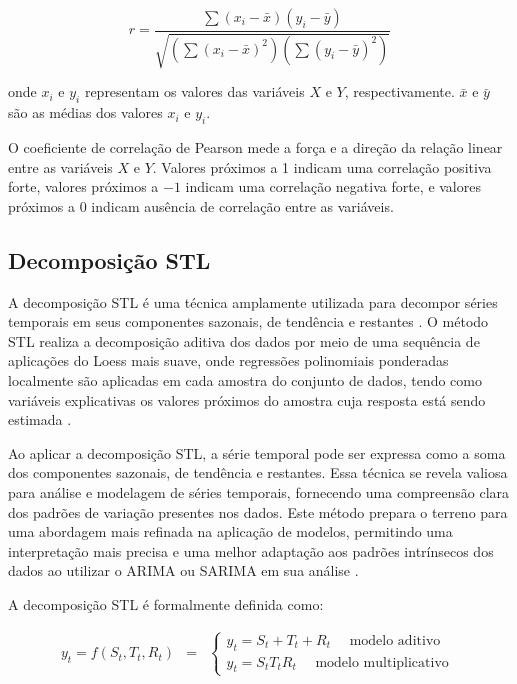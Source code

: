  \begin{equation}
 	r=\frac{\sum\left(x_i-\bar{x}\right)\left(y_i-\bar{y}\right)}{\sqrt{\left(\sum\left(x_i-\bar{x}\right)^2\right)\left(\sum\left(y_i-\bar{y}\right)^2\right)}}
 \end{equation}
 
 \noindent onde $x_i$ e $y_i$ representam os valores das variáveis $X$ e $Y$, respectivamente. $\bar{x}$ e $\bar{y}$ são as médias dos valores $x_i$ e $y_i$. 
 
O coeficiente de correlação de Pearson mede a força e a direção da relação linear entre as variáveis $X$ e $Y$. Valores próximos a 1 indicam uma correlação positiva forte, valores próximos a $-1$ indicam uma correlação negativa forte, e valores próximos a $0$ indicam  ausência de correlação entre as variáveis.
 
\subsection{Decomposi\c c\~ao STL}
 
A decomposição STL é uma técnica amplamente utilizada para decompor séries temporais em seus componentes sazonais, de tendência e restantes \cite{RIBEIRO2023112982}. O método STL realiza a decomposição aditiva dos dados por meio de uma sequência de aplicações do Loess mais suave, onde regressões polinomiais ponderadas localmente são aplicadas em cada amostra do conjunto de dados, tendo como variáveis explicativas os valores próximos do amostra cuja resposta está sendo estimada \cite{Theodosiou20111178}.
 
Ao aplicar a decomposição STL, a série temporal pode ser expressa como a soma dos componentes sazonais, de tendência e restantes. Essa técnica se revela valiosa para análise e modelagem de séries temporais, fornecendo uma compreensão clara dos padrões de variação presentes nos dados. Este método prepara o terreno para uma abordagem mais refinada na aplicação de modelos, permitindo uma interpretação mais precisa e uma melhor adaptação aos padrões intrínsecos dos dados ao utilizar o ARIMA ou SARIMA em sua análise \cite{RIBEIRO2023112982}.
 
A decomposição STL é formalmente definida como:
 
 \begin{eqnarray}
 	y_t=f\left(S_t, T_t, R_t\right)&=&\left\{\begin{array}{l}
 		y_t=S_t+T_t+R_t \quad \text { modelo aditivo } \\
 		y_t=S_t T_t R_t \quad \text { modelo multiplicativo }
 	\end{array}\right. \label{eq:stl}
 \end{eqnarray}

